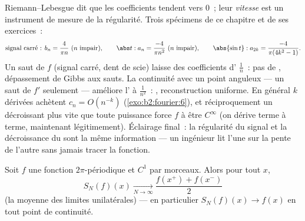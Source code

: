 \begin{example}\label{ex:b2:fourier:decaytable}
Riemann--Lebesgue dit que les coefficients tendent vers $0$~; leur
\emph{vitesse} est un instrument de mesure de la régularité. Trois
spécimens de ce chapitre et de ses exercices~:
\[
\text{signal carré~: } b_n = \frac{4}{\pi n}\ (n\ \text{impair}),
\qquad
\abs t : a_n = \frac{-4}{\pi n^2}\ (n\ \text{impair}),
\qquad
\abs{\sin t} : a_{2k} = \frac{-4}{\pi(4k^2-1)} .
\]
Un saut de $f$ (signal carré, dent de scie) laisse des coefficients
d' $\frac1n$~: pas de , dépassement de Gibbs
aux sauts. La continuité avec un point anguleux --- un saut de $f'$
seulement --- améliore l' à $\frac{1}{n^2}$~: , reconstruction uniforme. En général $k$ dérivées achètent
$c_n = O(n^{-k})$ (\cref{exo:b2:fourier:6}), et réciproquement un
 décroissant plus vite que toute puissance force $f$ à être
$C^\infty$ (on dérive terme à terme, maintenant légitimement).
Éclairage final~: la régularité du signal et la décroissance du
 sont la même information --- un ingénieur lit l'une sur la
pente de l'autre sans jamais tracer la fonction.
\end{example}

\begin{theorem}[Dirichlet]\label{thm:b2:fourier:dirichlet}
Soit $f$ une fonction $2\pi$-périodique et $C^1$ par morceaux. Alors
pour tout $x$,
\[
S_N(f)(x) \xrightarrow[N \to \infty]{}
\frac{f(x^+) + f(x^-)}{2}
\]
(la moyenne des limites unilatérales) --- en particulier $S_N(f)(x)
\to f(x)$ en tout point de continuité.
\end{theorem}


